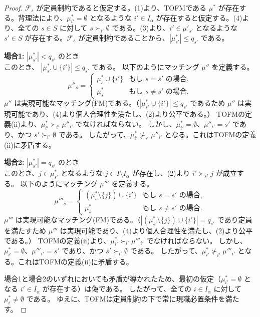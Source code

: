 \documentclass[12pt, a4paper]{article}
\theoremstyle{definition}
\theoremstyle{remark}
\theoremstyle{plain}
\begin{document}
\begin{proof}
  $\mathcal{F}_s$ が定員制約であると仮定する。(1)より、TOFMである $\mu^*$ が存在する。背理法により、$\mu^*_{i'} = \emptyset$ となるような $i' \in I_\alpha$ が存在すると仮定する。(4)より、全ての $s \in S$ に対して $s \succ_{i'} \emptyset$ である。(3)より、$i' \in \mu'_{s'}$ となるような $s' \in S$ が存在する。$\mathcal{F}_s$ が定員制約であることから、$|\mu^*_{s'}| \leq q_{s'}$ である。

  \textbf{場合1:} $|\mu^*_{s'}| < q_{s'}$ のとき\\
  このとき、 $|\mu^*_{s'} \cup \{i'\}| \leq q_{s'}$ である。
  以下のようにマッチング $\mu''$ を定義する。
  \[
      \mu''_{s} =
      \begin{cases}
      \mu^*_{s} \cup \{i'\} & \text{もし } s = s' \text{ の場合}, \\
      \mu^*_{s} & \text{もし } s \neq s' \text{ の場合}.
      \end{cases}
  \]
  $\mu''$ は実現可能なマッチング(FM)である。（$|\mu^*_{s'} \cup \{i'\}| \leq q_{s'}$ であるため $\mu''$ は実現可能であり、(4)より個人合理性を満たし、(2)より公平である。）
  TOFMの定義(ii)より、$\mu^*_{i'} \succ_{i'} \mu''_{i'}$ でなければならない。
  しかし、$\mu^*_{i'} = \emptyset$、$\mu''_{i'} = s'$ であり、かつ $s' \succ_{i'} \emptyset$ である。
  したがって、$\mu^*_{i'} \nsucc_{i'} \mu''_{i'}$ となる。これはTOFMの定義(ii)に矛盾する。

  \textbf{場合2:} $|\mu^*_{s'}| = q_{s'}$ のとき\\
このとき、$j \in \mu^*_{s'}$ となるような $j \in I \setminus I_\alpha$ が存在し、(2)より $i' \succ_{s'} j$ が成立する。
以下のようにマッチング $\mu'''$ を定義する。
\[
    \mu'''_{s} =
    \begin{cases}
    (\mu^*_{s} \setminus \{j\}) \cup \{i'\} & \text{もし } s = s' \text{ の場合}, \\
    \mu^*_{s} & \text{もし } s \neq s' \text{ の場合}.
    \end{cases}
\]
$\mu'''$ は実現可能なマッチング(FM)である。（$|(\mu^*_{s'}\setminus \{j\}) \cup \{i'\}| = q_{s'}$ であり定員を満たすため $\mu'''$ は実現可能であり、(4)より個人合理性を満たし、(2)より公平である。）
TOFMの定義(ii)より、$\mu^*_{i'} \succ_{i'} \mu'''_{i'}$ でなければならない。
しかし、$\mu^*_{i'} = \emptyset$、$\mu'''_{i'} = s'$ であり、かつ $s' \succ_{i'} \emptyset$ である。
したがって、$\mu^*_{i'} \nsucc_{i'} \mu'''_{i'}$ となる。これはTOFMの定義(ii)に矛盾する。

場合1と場合2のいずれにおいても矛盾が導かれたため、最初の仮定（$\mu^*_{i'} = \emptyset$ となる $i' \in I_\alpha$ が存在する）は偽である。
したがって、全ての $i \in I_\alpha$ に対して $\mu^*_i \neq \emptyset$ である。
ゆえに、TOFMは定員制約の下で常に現職必置条件を満たす。
\end{proof}
\end{document}
